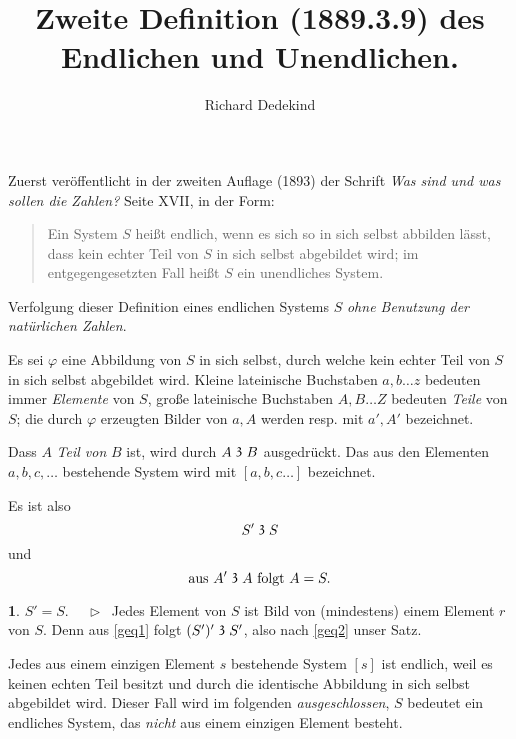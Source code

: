 \documentclass[leqno,hidelinks,10pt]{article}
\theoremstyle{definition}
\newtheorem{satz}{\protect\satzname}
\newcommand{\satzname}{}
\renewcommand{\satzname}{\hspace{-4pt}.\ Satz}%
\renewcommand{\satzname}{\hspace{-4pt}.\ Theorem}%
\newcommand\Beweis{\medskip \newline $ \phantom{'.'} \rhd \ $}%
\newcommand\TeilVon{\mathrel{\raisebox{0.45ex}{$\mathfrak{3}$}}}
\begin{document}
\hypersetup{pageanchor=false}

\title{Zweite Definition (1889.3.9) des Endlichen und Unendlichen.}
\author{Richard Dedekind}
\date{\phantom{} }
\maketitle

\thispagestyle{empty}

\begin{paracol}{2} %
    \begin{leftcolumn}

\noindent Zuerst veröffentlicht in der zweiten Auflage (1893) der Schrift
\textit{\glqq Was sind und was sollen die Zahlen?\grqq{}} Seite XVII, in der Form:%

\begin{quote}
Ein System $S$ heißt endlich, wenn es sich so in sich selbst abbilden
lässt, dass kein echter Teil von $S$ in sich selbst abgebildet
wird; im entgegengesetzten Fall heißt $S$ ein unendliches System.
\end{quote}

Verfolgung dieser Definition eines endlichen Systems $S$
\emph{ohne Benutzung der natürlichen Zahlen}.

Es sei $\varphi$ eine Abbildung von $S$ in sich selbst, durch welche kein echter
Teil von $S$ in sich selbst abgebildet wird.
Kleine lateinische Buchstaben  $a, b \ldots z$ bedeuten immer \emph{Elemente} von
$S$, große lateinische Buchstaben $A, B \ldots Z$ bedeuten \emph{Teile} von $S$;
die durch $\varphi$ erzeugten Bilder von $a, A$ werden resp. mit $a', A'$ bezeichnet.

Dass $A$ \emph{Teil von} $B$ ist, wird durch $A \TeilVon B$ ausgedrückt. Das aus den
Elementen $a, b, c, \ldots $ bestehende System wird mit $[a, b, c \ldots]$ bezeichnet.

Es ist also
\begin{equation}\label{geq1}
				S' \TeilVon S
\end{equation}
und%
\begin{equation}\label{geq2}
		\text{aus } A' \TeilVon A \text{ folgt } A = S.
\end{equation}

\begin{satz}\label{gthm1}$S' = S$.
\Beweis
Jedes Element von $S$ ist Bild von (mindestens) einem Element $r$ von $S$. Denn
aus \eqref{geq1} folgt $(S')' \TeilVon S'$, also nach \eqref{geq2} unser Satz.
\end{satz}
Jedes aus einem einzigen Element $s$ bestehende System $[s]$ ist endlich, weil
es keinen echten Teil besitzt und durch die identische Abbildung in sich selbst
abgebildet wird. Dieser Fall wird im folgenden \emph{ausgeschlossen}, $S$ bedeutet
ein endliches System, das \emph{nicht} aus einem einzigen Element besteht.


\end{leftcolumn}
\end{paracol}
\end{document}
